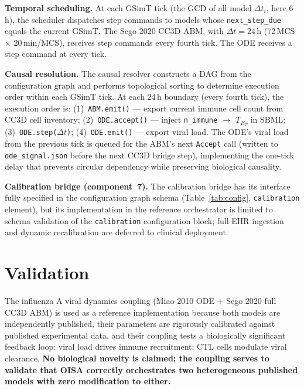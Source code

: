 \documentclass[conference,letterpaper,10pt]{IEEEtran}
\begin{document}
\textbf{Temporal scheduling.} At each GSimT tick (the GCD of all model
$\Delta t_i$, here 6\,h), the scheduler dispatches step commands to
models whose \texttt{next\_step\_due} equals the current GSimT. The
Sego 2020 CC3D ABM, with $\Delta t\!=\!24$\,h (72\,MCS $\times$
20\,min/MCS), receives step commands every fourth tick. The ODE
receives a step command at every tick.

\textbf{Causal resolution.} The causal resolver constructs a DAG from
the configuration graph and performs topological sorting to determine
execution order within each GSimT tick. At each 24\,h boundary (every
fourth tick), the execution order is: (1)~\texttt{ABM.emit()} ---
export current immune cell count from CC3D cell inventory;
(2)~\texttt{ODE.accept()} --- inject \texttt{n\_immune} $\to$
$T_{E_T}$ in SBML; (3)~\texttt{ODE.step($\Delta t$)}; (4)~\texttt{ODE.emit()}
--- export viral load. The ODE's viral load from the previous tick is
queued for the ABM's next \texttt{Accept} call (written to
\texttt{ode\_signal.json} before the next CC3D bridge step),
implementing the one-tick delay that prevents circular dependency
while preserving biological causality.

\textbf{Calibration bridge (component~7).} The calibration bridge has
its interface fully specified in the configuration graph schema
(Table~\ref{tab:config}, \texttt{calibration} element), but its
implementation in the reference orchestrator is limited to schema
validation of the \texttt{calibration} configuration block; full EHR
ingestion and dynamic recalibration are deferred to clinical
deployment.

\section{Validation}\label{sec:validation}

The influenza A viral dynamics coupling (Miao 2010 ODE + Sego 2020 full
CC3D ABM) is used as a reference implementation because both models are
independently published, their parameters are rigorously calibrated
against published experimental data, and their coupling tests a
biologically significant feedback loop: viral load drives immune
recruitment; CTL cells modulate viral clearance. \textbf{No biological
novelty is claimed; the coupling serves to validate that OISA correctly
orchestrates two heterogeneous published models with zero modification
to either.}
\end{document}

